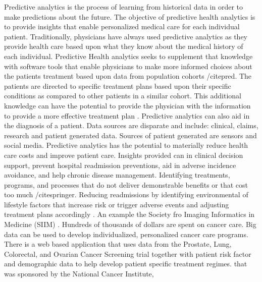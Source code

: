 \documentclass[sigconf]{acmart}
\begin{document}
Predictive analytics is the process of learning from historical data in order to make predictions about the future. The objective of predictive health analytics is to provide insights that enable personalized medical care for each individual patient. Traditionally, physicians have always used predictive analytics as they provide health care based upon what they know about the medical history of each individual. Predictive Health analytics seeks to supplement that knowledge with software tools that enable physicians to make more informed choices about the patients treatment based upon data from population cohorts /cite{pred}.  The patients are directed to specific treatment plans based upon their specific conditions as compared to other patients in a similar cohort.  This additional knowledge can have the potential to provide the physician with the information to provide a more effective treatment plan \cite{www-google-pred}. Predictive analytics can also aid in the diagnosis of a patient. Data sources are disparate and include: clinical, claims, research and patient generated data. Sources of patient generated are sensors and social media.  
Predictive analytics has the potential to materially reduce health care costs and improve patient care.   Insights provided can in clinical decision support, prevent hospital readmission preventions, aid in adverse incidence avoidance, and help chronic disease management. 
Identifying treatments, programs, and processes that do not deliver demonstrable benefits or that cost too much /cite{springer}. Reducing readmissions by identifying environmental of lifestyle factors that increase risk or trigger adverse events and adjusting treatment plans accordingly \cite{springer}.   
An example the Society fro Imaging Informatics in Medicine (SIIM) . Hundreds of thousands of dollars are spent on cancer care. Big data can be used to develop individualized, personalized cancer care programs. There is a web based application that uses data from  the Prostate, Lung, Colorectal, and Ovarian Cancer Screening trial together with patient risk factor and demographic data to help develop patient specific treatment regimes. that was sponsored by the National Cancer Institute,  
\end{document}
